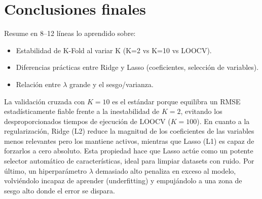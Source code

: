 \documentclass{report} %
\begin{document}
\section{Conclusiones finales}
Resume en 8--12 líneas lo aprendido sobre:
\begin{itemize}
    \item Estabilidad de K-Fold al variar K (K=2 vs K=10 vs LOOCV).
    \item Diferencias prácticas entre Ridge y Lasso (coeficientes, selección de variables).
    \item Relación entre $\lambda$ grande y el sesgo/varianza.
\end{itemize}

\vspace{0.5cm}
\noindent La validación cruzada con $K=10$ es el estándar porque equilibra un RMSE estadísticamente fiable frente a la inestabilidad de $K=2$, evitando los desproporcionados tiempos de ejecución de LOOCV ($K=100$). En cuanto a la regularización, Ridge (L2) reduce la magnitud de los coeficientes de las variables menos relevantes pero los mantiene activos, mientras que Lasso (L1) es capaz de forzarlos a cero absoluto. Esta propiedad hace que Lasso actúe como un potente selector automático de características, ideal para limpiar datasets con ruido. Por último, un hiperparámetro $\lambda$ demasiado alto penaliza en exceso al modelo, volviéndolo incapaz de aprender (underfitting) y empujándolo a una zona de sesgo alto donde el error se dispara.
\end{document}
